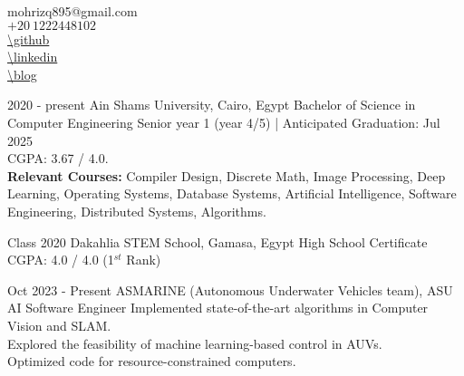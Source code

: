 \documentclass[hidelinks]{report}
\begin{document}
\noindent
\begin{minipage}{.4\textwidth}
    \vspace{-1mm}
\end{minipage}%
\hfill\hspace{.2\textwidth}
\begin{minipage}{.5\textwidth}
 \large
    mohrizq895@gmail.com\\ [.2\baselineskip]%
    $+20 \ 1222448102$ \\[.2\baselineskip]
    \url{\github} \\[.2\baselineskip]
    \url{\linkedin} \\ %
    \url{\blog} 
\end{minipage}


\vspace{2mm}

\large 
{}

\entry
    {2020 - present} 
    {Ain Shams University, \normalfont Cairo, Egypt  }
    {Bachelor of Science in Computer Engineering }
    {\textbullet Senior year 1 (year 4/5) | Anticipated Graduation: Jul 2025 \\ 
     \textbullet CGPA: 3.67 / 4.0. \\  
     \textbullet \textbf{Relevant Courses:} Compiler Design, Discrete Math, Image Processing, Deep Learning,
     Operating Systems, Database Systems, Artificial Intelligence, Software Engineering, Distributed Systems, 
     Algorithms. 
    }  

\entry
    {Class 2020}
    {Dakahlia STEM School, \normalfont Gamasa, Egypt}
    {High School Certificate}
    {
    \textbullet CGPA: 4.0 / 4.0 (1$^{st}$ Rank)
    }

\vspace{2mm}


\entry
    {Oct 2023 - Present }
    {ASMARINE (Autonomous Underwater Vehicles team), \normalfont ASU  }
    {AI Software Engineer}
    {
      \textbullet Implemented state-of-the-art algorithms in Computer Vision and SLAM. \\
      \textbullet Explored the feasibility of machine learning-based control in AUVs. \\
      \textbullet Optimized code for resource-constrained computers.
    }
\end{document}
